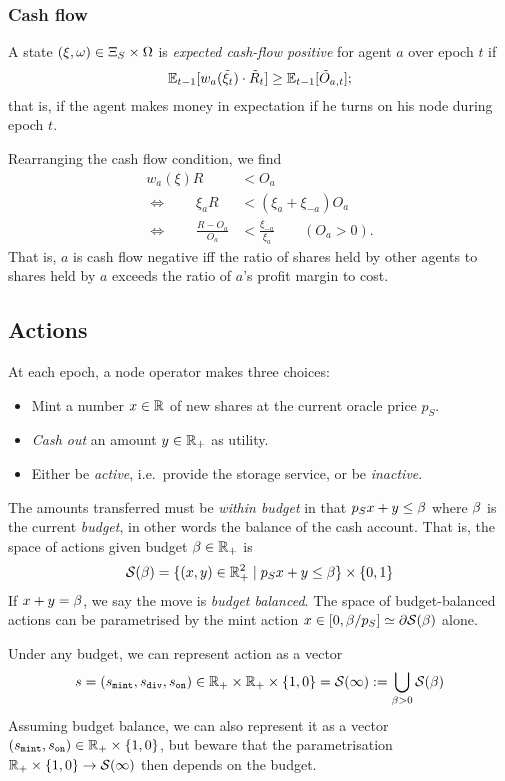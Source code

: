 \subsubsection{Cash flow}
%
A state $(\xi,\omega)\in\Xi_S\times \Omega$ is \emph{expected cash-flow positive} for agent $a$ over epoch $t$ if 
%
\[
  \mathbb{E}_{t-1}[w_a(\tilde \xi_t)\cdot \tilde{R}_t] \geq \mathbb{E}_{t-1}[ \tilde{O}_{a,t}];
\]
%
that is, if the agent makes money in expectation if he turns on his node during epoch $t$.

Rearranging the cash flow condition, we find
\begin{align*}
  w_a(\xi) R &< O_a \\
  \Leftrightarrow \qquad \xi_a R &< (\xi_a+\xi_{-a})O_a \\
  \Leftrightarrow \qquad \frac { R-O_a } {O_a} &< \frac{\xi_{-a}}{\xi_a} \qquad (O_a>0).
\end{align*}
%
That is, $a$ is cash flow negative iff the ratio of shares held by other agents to shares held by $a$ exceeds the ratio of $a$'s profit margin to cost.

\subsection{Actions}
\label{section:actions}

At each epoch, a node operator makes three choices:
%
\begin{itemize}
  \item Mint a number $x\in\mathbb{R}$ of new shares at the current oracle price $p_S$.
  \item \emph{Cash out} an amount $y\in\mathbb{R}_+$ as utility.
  \item Either be \emph{active}, i.e.~provide the storage service, or be \emph{inactive}.
\end{itemize}
%
The amounts transferred must be \emph{within budget} in that $p_Sx+y\leq \beta$ where $\beta$ is the current \emph{budget}, in other words the balance of the cash account.
%
That is, the space of actions given budget $\beta\in\mathbb{R}_+$ is
\[
  \mathcal{S}(\beta) = \{(x,y)\in \mathbb{R}_+^2 \mid p_Sx+y\leq \beta \} \times \{0,1\}
\]
%
If $x+y = \beta$, we say the move is \emph{budget balanced}.
%
The space of budget-balanced actions can be parametrised by the mint action $x\in[0,\beta/p_S]\simeq\partial\mathcal{S}(\beta)$ alone.

Under any budget, we can represent action as a vector
%
\[
  s = (s_\mathtt{mint},s_\mathtt{div},s_\mathtt{on}) \in \mathbb{R}_+ \times \mathbb{R}_+ \times \{1,0\} = \mathcal{S}(\infty) := \bigcup_{\beta>0}\mathcal{S}(\beta)
\]
%
Assuming budget balance, we can also represent it as a vector $(s_\mathtt{mint},s_{\mathtt{on}})\in\mathbb{R}_+\times\{1,0\}$, but beware that the parametrisation $\mathbb{R}_+ \times  \{1,0\}\rightarrow \mathcal{S}(\infty)$ then depends on the budget.



